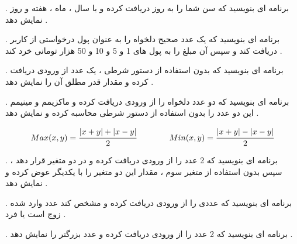 \documentclass[12pt]{article}
\begin{document}
 . برنامه ای بنویسید که سن شما را به روز دریافت کرده و با سال ، ماه ، هفته و روز نمایش دهد .  









 . برنامه ای بنویسید که
 یک عدد صحیح دلخواه را به عنوان پول درخواستی از کاربر دریافت کند و سپس آن مبلغ را به پول های 1 و 5 و 10 و 50 هزار تومانی خرد کند .
 
 
 
 
 
 
 
 
 
  . برنامه ای بنویسید که بدون استفاده از دستور شرطی 
،
یک عدد از ورودی دریافت کرده و مقدار قدر مطلق آن را نمایش دهد .







 . برنامه ای بنویسید که دو عدد دلخواه را از ورودی دریافت کرده و ماکزیمم و مینیمم این دو عدد را بدون استفاده از دستور شرطی
محاسبه کرده و نمایش دهد .


\begin{align*}
Max(x,y) = \cfrac{|x+y| + |x-y|}{2} \qquad \qquad
Min(x,y) = \cfrac{|x+y| - |x-y|}{2}
\end{align*}






 . برنامه ای بنویسید که 2 عدد را از ورودی دریافت کرده و در دو متغیر قرار دهد ، سپس بدون استفاده از متغیر سوم ، مقدار این دو متغیر را با یکدیگر عوض کرده و نمایش دهد .











 . برنامه ای بنویسید که عددی را از ورودی دریافت کرده و مشخص کند عدد وارد شده زوج است یا فرد .
















 . برنامه ای بنویسید که 2 عدد را از ورودی دریافت کرده و عدد بزرگتر را نمایش دهد .
\end{document}
